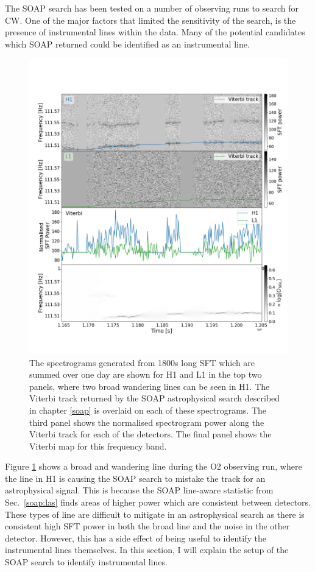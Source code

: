% 
The SOAP search has been tested on a number of observing runs
to search for \gls{CW}.  One of the major factors that limited the sensitivity
of the search, is the presence of instrumental lines within the data.  Many of
the potential candidates which SOAP returned could be identified as an
instrumental line.
%
\begin{figure}[hp]
	\includegraphics[width=\textwidth]{C6_detchar/plot_F111_5_wandering_line.png}
        \caption[Broad wandering line example.]{ The spectrograms generated from 1800s long \gls{SFT} which are summed over one day are shown for H1 and L1 in the top two panels, where two broad wandering lines can be seen in H1.
        The Viterbi track returned by the SOAP astrophysical search described in chapter \ref{soap} is overlaid on each of these spectrograms.
        The third panel shows the normalised spectrogram power along the Viterbi track for each of the detectors. The final
        panel shows the Viterbi map for this frequency band.
			}
\label{detchar:soap:astrowander}

\end{figure}
%
Figure \ref{detchar:soap:astrowander} shows a broad and wandering line during the O2 observing run, where the line in H1 is causing the SOAP search to mistake the track for an astrophysical signal.
This is because the SOAP line-aware statistic from Sec.~\ref{soap:las} finds
areas of higher power which are consistent between detectors. These types of line are difficult to mitigate in an astrophysical
search as there is consistent high \gls{SFT} power in both the broad line and the noise in the other detector.
However, this has a side effect of being useful to identify the
instrumental lines themselves.
In this section, I will explain the setup of the SOAP search to identify
instrumental lines.

